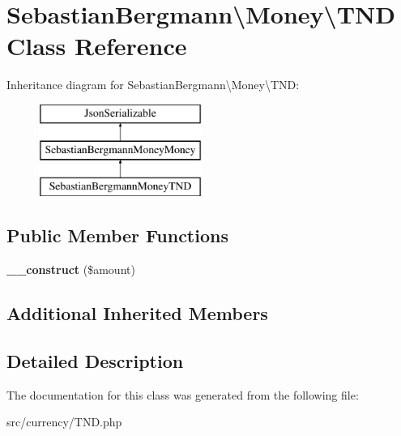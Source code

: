 \hypertarget{classSebastianBergmann_1_1Money_1_1TND}{}\section{Sebastian\+Bergmann\textbackslash{}Money\textbackslash{}T\+N\+D Class Reference}
\label{classSebastianBergmann_1_1Money_1_1TND}
Inheritance diagram for Sebastian\+Bergmann\textbackslash{}Money\textbackslash{}T\+N\+D\+:\begin{figure}[H]
\begin{center}
\leavevmode
\includegraphics[height=3.000000cm]{classSebastianBergmann_1_1Money_1_1TND}
\end{center}
\end{figure}
\subsection*{Public Member Functions}
\begin{DoxyCompactItemize}
\item 
\hypertarget{classSebastianBergmann_1_1Money_1_1TND_a24667afeefe2ac7ee6c6c04dd3ad8229}{}{\bfseries \+\_\+\+\_\+construct} (\$amount)\label{classSebastianBergmann_1_1Money_1_1TND_a24667afeefe2ac7ee6c6c04dd3ad8229}

\end{DoxyCompactItemize}
\subsection*{Additional Inherited Members}


\subsection{Detailed Description}


The documentation for this class was generated from the following file\+:\begin{DoxyCompactItemize}
\item 
src/currency/T\+N\+D.\+php\end{DoxyCompactItemize}
